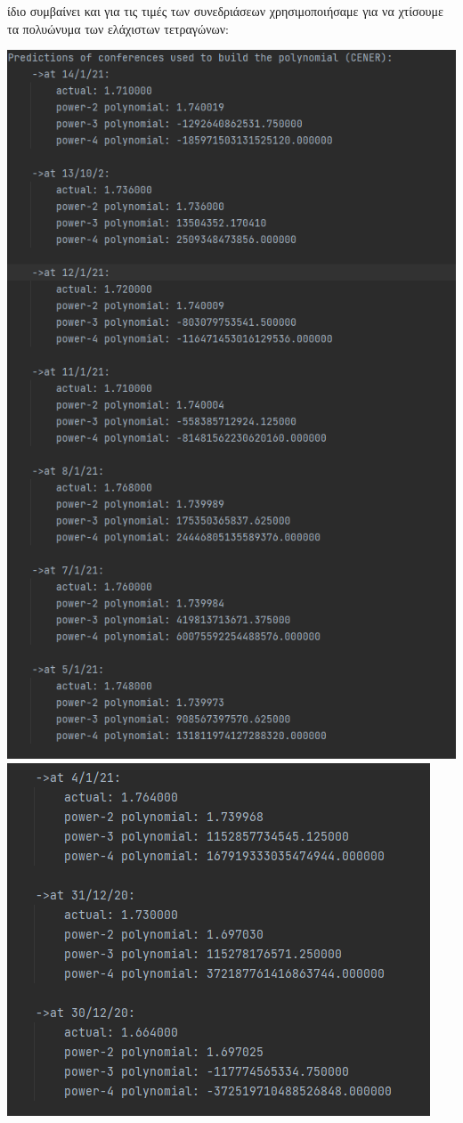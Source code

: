 \documentclass{article}
\newcommand{\gt}{\greektext}
\begin{document}
 ίδιο συμβαίνει και για τις τιμές των συνεδριάσεων
 χρησιμοποιήσαμε για να χτίσουμε τα πολυώνυμα των ελάχιστων τετραγώνων:
\begin{center}
    \includegraphics[scale=0.7]{images/cener_past.png}
    \includegraphics[scale=0.7]{images/cener_past1.png}

\end{center}
\end{document}
